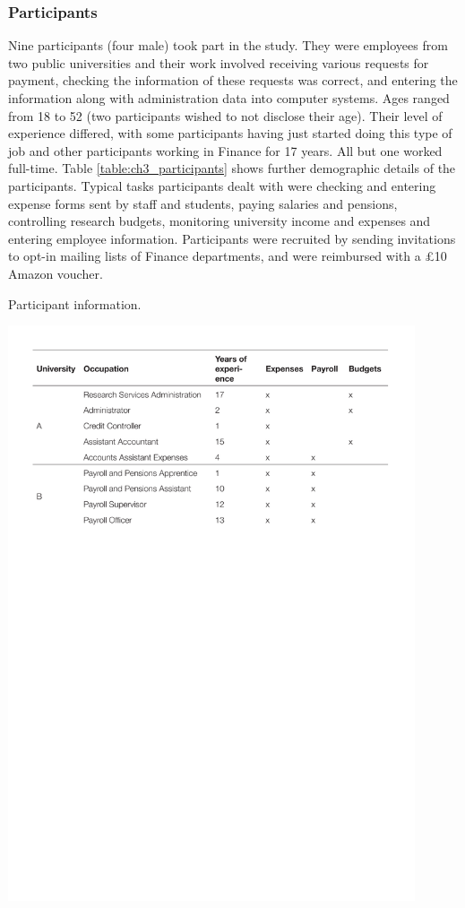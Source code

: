\subsubsection{Participants}
Nine participants (four male) took part in the study. They were employees from two public universities and their work involved receiving various requests for payment, checking the information of these requests was correct, and entering the information along with administration data into computer systems. Ages ranged from 18 to 52 (two participants wished to not disclose their age). Their level of experience differed, with some participants having just started doing this type of job and other participants working in Finance for 17 years. All but one worked full-time. Table \ref{table:ch3_participants} shows further demographic details of the participants. Typical tasks participants dealt with were checking and entering expense forms sent by staff and students, paying salaries and pensions, controlling research budgets, monitoring university income and expenses and entering employee information. Participants were recruited by sending invitations to opt-in mailing lists of Finance departments, and were reimbursed with a \pounds10 Amazon voucher.

\begin{table}
\caption{Participant information.}
\centering
\includegraphics[width=0.9\textwidth]{images/ch12/Study1-Table1.pdf}
\vspace{-3pt}
\label{tbl:ch12-Table1}
\end{table}

